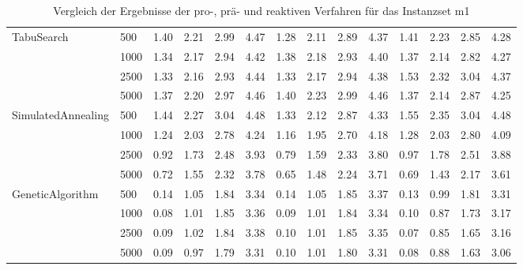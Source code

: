 \begin{table}[H]
{\begin{tabular}{ll|rrrr|rrrr|rrrr}
TabuSearch & 500  &           1.40 & 2.21 & 2.99 & 4.47 &            1.28 & 2.11 & 2.89 & 4.37 &          1.41 & 2.23 & 2.85 & 4.28 \\
                 & 1000 &           1.34 & 2.17 & 2.94 & 4.42 &            1.38 & 2.18 & 2.93 & 4.40 &          1.37 & 2.14 & 2.82 & 4.27 \\
                 & 2500 &           1.33 & 2.16 & 2.93 & 4.44 &            1.33 & 2.17 & 2.94 & 4.38 &          1.53 & 2.32 & 3.04 & 4.37 \\
                 & 5000 &           1.37 & 2.20 & 2.97 & 4.46 &            1.40 & 2.23 & 2.99 & 4.46 &          1.37 & 2.14 & 2.87 & 4.25 \\ \hline
SimulatedAnnealing & 500  &           1.44 & 2.27 & 3.04 & 4.48 &            1.33 & 2.12 & 2.87 & 4.33 &          1.55 & 2.35 & 3.04 & 4.48 \\
                 & 1000 &           1.24 & 2.03 & 2.78 & 4.24 &            1.16 & 1.95 & 2.70 & 4.18 &          1.28 & 2.03 & 2.80 & 4.09 \\
                 & 2500 &           0.92 & 1.73 & 2.48 & 3.93 &            0.79 & 1.59 & 2.33 & 3.80 &          0.97 & 1.78 & 2.51 & 3.88 \\
                 & 5000 &           0.72 & 1.55 & 2.32 & 3.78 &            0.65 & 1.48 & 2.24 & 3.71 &          0.69 & 1.43 & 2.17 & 3.61 \\ \hline
GeneticAlgorithm & 500  &           0.14 & 1.05 & 1.84 & 3.34 &            0.14 & 1.05 & 1.85 & 3.37 &          0.13 & 0.99 & 1.81 & 3.31 \\
                 & 1000 &           0.08 & 1.01 & 1.85 & 3.36 &            0.09 & 1.01 & 1.84 & 3.34 &          0.10 & 0.87 & 1.73 & 3.17 \\
                 & 2500 &           0.09 & 1.02 & 1.84 & 3.38 &            0.10 & 1.01 & 1.85 & 3.35 &          0.07 & 0.85 & 1.65 & 3.16 \\
                 & 5000 &           0.09 & 0.97 & 1.79 & 3.31 &            0.10 & 1.01 & 1.80 & 3.31 &          0.08 & 0.88 & 1.63 & 3.06 \\
\bottomrule
\end{tabular}
}
\caption{Vergleich der Ergebnisse der pro-, prä- und reaktiven Verfahren für das Instanzset m1}
\label{tab:comparision_m1}
\end{table}


